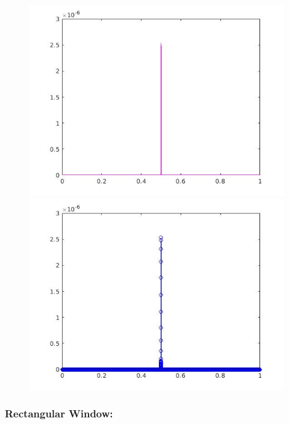 \documentclass[a4paper,11pt]{article}
\begin{document}
\begin{figure}[!hp]
\centering
\begin{minipage}{.5\textwidth}
  \centering
  \includegraphics[width=1\linewidth]{images/lab2_52.jpg}
\end{minipage}%
\begin{minipage}{.5\textwidth}
  \centering
  \includegraphics[width=1\linewidth]{images/lab2_53.jpg}
\end{minipage}
\end{figure}

\subsubsection{Rectangular Window:}
\end{document}
